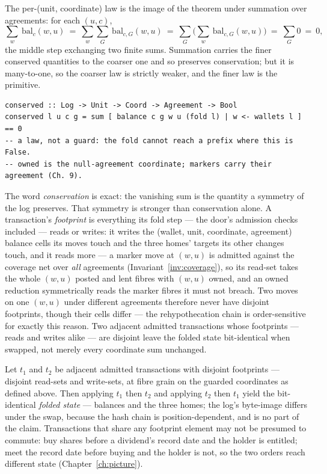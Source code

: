 The per-(unit, coordinate) law is the image of the theorem under summation over agreements:
for each $(u,c)$,
\[
\sum_{w}\ \mathrm{bal}_c(w,u)\ =\ \sum_{w}\sum_{G}\ \mathrm{bal}_{c,G}(w,u)\ =\ \sum_{G}\Big(\sum_{w}\ \mathrm{bal}_{c,G}(w,u)\Big)\ =\ \sum_{G} 0\ =\ 0,
\]
the middle step exchanging two finite sums. Summation carries the finer conserved
quantities to the coarser one and so preserves conservation; but it is many-to-one, so the
coarser law is strictly weaker, and the finer law is the primitive.

\begin{lstlisting}
conserved :: Log -> Unit -> Coord -> Agreement -> Bool
conserved l u c g = sum [ balance c g w u (fold l) | w <- wallets l ] == 0
-- a law, not a guard: the fold cannot reach a prefix where this is False.
-- owned is the null-agreement coordinate; markers carry their agreement (Ch. 9).
\end{lstlisting}

The word \emph{conservation} is exact: the vanishing sum is the quantity a
symmetry of the log preserves. That symmetry is stronger than conservation alone. A
transaction's \emph{footprint} is everything its fold step --- the door's admission
checks included --- reads or writes: it writes the (wallet, unit, coordinate, agreement)
balance cells its moves touch and the three homes' targets its other changes touch, and
it reads more --- a marker move at $(w,u)$ is admitted against the coverage net over
\emph{all} agreements (Invariant~\ref{inv:coverage}), so its read-set takes the whole
$(w,u)$ posted and lent fibres with $(w,u)$ owned, and an owned reduction symmetrically
reads the marker fibres it must not breach. Two moves on one $(w,u)$ under different
agreements therefore never have disjoint footprints, though their cells differ --- the
rehypothecation chain is order-sensitive for exactly this reason. Two adjacent admitted
transactions whose footprints --- reads and writes alike --- are disjoint leave the
folded state bit-identical when swapped, not merely every coordinate sum unchanged.

\begin{proposition}\label{prop:independent-commute}
Let $t_1$ and $t_2$ be adjacent admitted transactions with disjoint footprints ---
disjoint read-sets and write-sets, at fibre grain on the guarded coordinates as defined
above. Then applying $t_1$ then $t_2$ and applying $t_2$ then $t_1$ yield the
bit-identical \emph{folded state} --- balances and the three homes; the log's byte-image
differs under the swap, because the hash chain is position-dependent, and is no part of
the claim. Transactions that share any footprint element may not be
presumed to commute: buy shares before a dividend's record date and the holder is
entitled; meet the record date before buying and the holder is not, so the two orders
reach different state (Chapter~\ref{ch:picture}).
\end{proposition}

